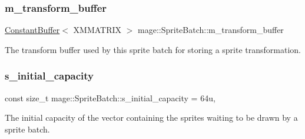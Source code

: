 \subsubsection{\texorpdfstring{m\+\_\+transform\+\_\+buffer}{m\_transform\_buffer}}
{\footnotesize\ttfamily \hyperlink{classmage_1_1_constant_buffer}{Constant\+Buffer}$<$ X\+M\+M\+A\+T\+R\+IX $>$ mage\+::\+Sprite\+Batch\+::m\+\_\+transform\+\_\+buffer\hspace{0.3cm}{\ttfamily [private]}}

The transform buffer used by this sprite batch for storing a sprite transformation. \hypertarget{classmage_1_1_sprite_batch_afb2e03e10674316b9948de0fec992e62}{}\label{classmage_1_1_sprite_batch_afb2e03e10674316b9948de0fec992e62} 
\subsubsection{\texorpdfstring{s\+\_\+initial\+\_\+capacity}{s\_initial\_capacity}}
{\footnotesize\ttfamily const size\+\_\+t mage\+::\+Sprite\+Batch\+::s\+\_\+initial\+\_\+capacity = 64u\hspace{0.3cm}{\ttfamily [static]}, {\ttfamily [private]}}

The initial capacity of the vector containing the sprites waiting to be drawn by a sprite batch. 